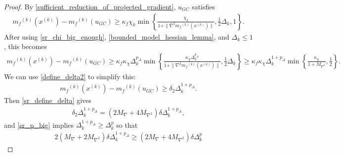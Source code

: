 \documentclass{article}
\theoremstyle{case}
\numberwithin{theorem}{subsection}
\newcommand{\dk}{\Delta_k}
\newcommand{\maxgrad}{{M_{\nabla}}}
\newcommand{\maxhessian}{{M_{\nabla^2}}}
\newcommand{\mfk}{{{m}_f}^{(k)}}
\newcommand{\xk}{{x^{(k)}}}
\begin{document}
\begin{proof}
By \cref{sufficient_reduction_of_projected_gradient}, $u_{GC}$ satisfies
\begin{align*}
\mfk(\xk) - \mfk(u_{GC}) \ge \kappa_f \chi_k \min\left\{ \frac{\chi_k}{1+\|\nabla^2 \mfk(\xk)\|}, \frac 1 2 \dk, 1 \right\}.
\end{align*}
After using \cref{sr_chi_big_enough}, \cref{bounded_model_hessian_lemma}, and $\dk \le 1$, this becomes
\begin{align*}
\mfk(\xk) - \mfk(u_{GC})
\ge \kappa_f \kappa_{\chi} \dk^{p_{\Delta}} \min\left\{ \frac{\kappa_{\chi} \dk^{p_{\Delta}}}{1+\|\nabla^2 \mfk(\xk)\|}, \frac 1 2 \dk \right\}
\ge \kappa_f \kappa_{\chi} \dk^{1 + p_{\Delta}} \min\left\{ \frac{\kappa_{\chi}}{1 + \maxhessian}, \frac 1 2  \right\}.
\end{align*}
We can use \cref{define_delta2} to simplify this:
\begin{align*}
\mfk(\xk) - \mfk(u_{GC}) \ge \delta_2 \dk^{1 + p_{\Delta}}.
\end{align*}
Then \cref{sr_define_delta} gives
\begin{align*}
\delta_2 \dk^{1 + p_{\Delta}} = \left(2\maxgrad + 4\maxhessian\right)\delta\dk^{1 + p_{\Delta}},
\end{align*}
and \cref{sr_p_big} implies $\dk^{1+p_{\Delta}} \ge \dk^p$ so that
\begin{align*}
2\left(\maxgrad + 2\maxhessian\right)\delta\dk^{1 + p_{\Delta}}
\ge \left(2\maxgrad + 4\maxhessian\right)\delta\dk^{p}
\end{align*}



\end{proof}
\end{document}
